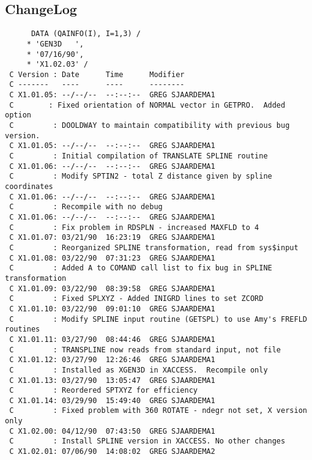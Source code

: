 \subsection{ChangeLog}
\begin{verbatim}
      DATA (QAINFO(I), I=1,3) /
     * 'GEN3D   ',
     * '07/16/90',
     * 'X1.02.03' /
 C Version : Date      Time      Modifier 
 C -------   ----      ----      --------
 C X1.01.05: --/--/--  --:--:--  GREG SJAARDEMA1
 C        : Fixed orientation of NORMAL vector in GETPRO.  Added option        
 C         : DOOLDWAY to maintain compatibility with previous bug version.    
 C X1.01.05: --/--/--  --:--:--  GREG SJAARDEMA1
 C         : Initial compilation of TRANSLATE SPLINE routine                    
 C X1.01.06: --/--/--  --:--:--  GREG SJAARDEMA1
 C         : Modify SPTIN2 - total Z distance given by spline coordinates       
 C X1.01.06: --/--/--  --:--:--  GREG SJAARDEMA1
 C         : Recompile with no debug                                            
 C X1.01.06: --/--/--  --:--:--  GREG SJAARDEMA1
 C         : Fix problem in RDSPLN - increased MAXFLD to 4                      
 C X1.01.07: 03/21/90  16:23:19  GREG SJAARDEMA1                                
 C         : Reorganized SPLINE transformation, read from sys$input             
 C X1.01.08: 03/22/90  07:31:23  GREG SJAARDEMA1                                
 C         : Added A to COMAND call list to fix bug in SPLINE transformation    
 C X1.01.09: 03/22/90  08:39:58  GREG SJAARDEMA1                                
 C         : Fixed SPLXYZ - Added INIGRD lines to set ZCORD                     
 C X1.01.10: 03/22/90  09:01:10  GREG SJAARDEMA1                                
 C         : Modify SPLINE input routine (GETSPL) to use Amy's FREFLD routines  
 C X1.01.11: 03/27/90  08:44:46  GREG SJAARDEMA1                                
 C         : TRANSPLINE now reads from standard input, not file                 
 C X1.01.12: 03/27/90  12:26:46  GREG SJAARDEMA1                                
 C         : Installed as XGEN3D in XACCESS.  Recompile only                  
 C X1.01.13: 03/27/90  13:05:47  GREG SJAARDEMA1                            
 C         : Reordered SPTXYZ for efficiency                                    
 C X1.01.14: 03/29/90  15:49:40  GREG SJAARDEMA1                                
 C         : Fixed problem with 360 ROTATE - ndegr not set, X version only      
 C X1.02.00: 04/12/90  07:43:50  GREG SJAARDEMA1                                
 C         : Install SPLINE version in XACCESS. No other changes                
 C X1.02.01: 07/06/90  14:08:02  GREG SJAARDEMA2                                

\end{verbatim}
